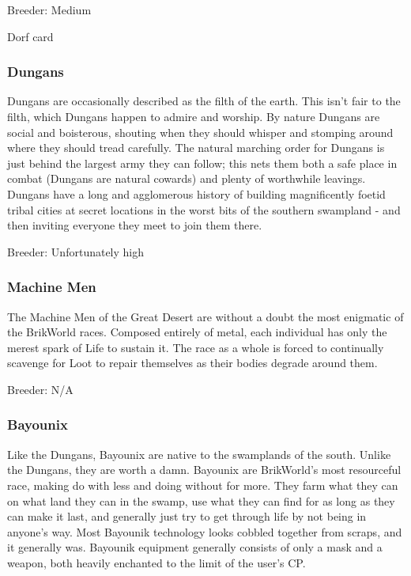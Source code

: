 \documentclass[12pt,a4paper,twocolumn]{article}
\begin{document}
Breeder: Medium

Dorf card

\subsubsection{Dungans}

Dungans are occasionally described as the filth of the earth.  This isn't fair to the filth, which Dungans happen to admire and worship.  By nature Dungans are social and boisterous, shouting when they should whisper and stomping around where they should tread carefully.  The natural marching order for Dungans is just behind the largest army they can follow; this nets them both a safe place in combat (Dungans are natural cowards) and plenty of worthwhile leavings.  Dungans have a long and agglomerous history of building magnificently foetid tribal cities at secret locations in the worst bits of the southern swampland - and then inviting everyone they meet to join them there.

Breeder: Unfortunately high

\subsubsection{Machine Men}

The Machine Men of the Great Desert are without a doubt the most enigmatic of the BrikWorld races.  Composed entirely of metal, each individual has only the merest spark of Life to sustain it.  The race as a whole is forced to continually scavenge for Loot to repair themselves as their bodies degrade around them.  

Breeder: N/A

\subsubsection{Bayounix}

Like the Dungans, Bayounix are native to the swamplands of the south.  Unlike the Dungans, they are worth a damn.  Bayounix are BrikWorld's most resourceful race, making do with less and doing without for more.  They farm what they can on what land they can in the swamp, use what they can find for as long as they can make it last, and generally just try to get through life by not being in anyone's way.  Most Bayounik technology looks cobbled together from scraps, and it generally was.  Bayounik equipment generally consists of only a mask and a weapon, both heavily enchanted to the limit of the user's CP.
\end{document}
